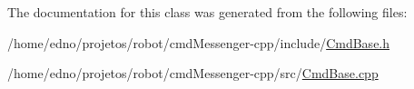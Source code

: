 The documentation for this class was generated from the following files\+:\begin{DoxyCompactItemize}
\item 
/home/edno/projetos/robot/cmd\+Messenger-\/cpp/include/\hyperlink{_cmd_base_8h}{Cmd\+Base.\+h}\item 
/home/edno/projetos/robot/cmd\+Messenger-\/cpp/src/\hyperlink{_cmd_base_8cpp}{Cmd\+Base.\+cpp}\end{DoxyCompactItemize}
